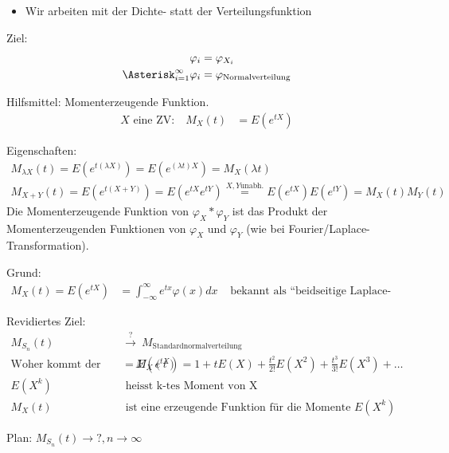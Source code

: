 \documentclass[10pt,a4paper]{scrartcl}
\begin{document}
\begin{itemize}
\item Wir arbeiten mit der Dichte- statt der Verteilungsfunktion
\end{itemize}

Ziel: 
\begin{align*}
\varphi_i & = \varphi_{X_i}\\
\Asterisk_{i=1}^\infty \varphi_i & = \varphi_{\text{Normalverteilung}} %
\end{align*}

Hilfsmittel: Momenterzeugende Funktion.
\begin{align*}
X \text{ eine ZV:} \quad M_X(t) & = E(e^{tX})
\end{align*}

Eigenschaften:
\begin{align*}
M_{\lambda X}(t) = E(e^{t(\lambda X)}) = E(e^{(\lambda t) X}) = M_X(\lambda t) \\
M_{X+Y}(t) = E(e^{t(X+Y)}) = E(e^{tX} e^{tY}) \stackrel{X,Y \text{unabh.}}{=} E(e^{tX}) E(e^{tY}) = M_X(t)M_Y(t)
\end{align*}
Die Momenterzeugende Funktion von $\varphi_X*\varphi_Y$ ist das Produkt der Momenterzeugenden Funktionen von $\varphi_X$ und $\varphi_Y$ (wie bei Fourier/Laplace-Transformation). 

Grund: 
\begin{align*}
M_X(t) = E(e^{tX}) & = \int_{-\infty}^\infty e^{tx} \varphi(x) dx & \text{ bekannt als ``beidseitige Laplace-Transformation''}
\end{align*}

Revidiertes Ziel:
\begin{align*}
M_{S_n}(t) \ &\stackrel{?}{\longrightarrow}\  M_{\text{Standardnormalverteilung}} \\
\text{Woher kommt der Name?}\qquad M_X(t) & = E(e^{tX}) = 1 + tE(X) + \frac{t^2}{2!}E(X^2) + \frac{t^3}{3!} E(X^3) + \dots \\
E(X^k) & \text{ heisst k-tes Moment von X} \\
M_X(t) &\text{ ist eine erzeugende Funktion für die Momente } E(X^k)
\end{align*}

Plan: $M_{S_n}(t) \longrightarrow ?, n\rightarrow \infty$
\end{document}
